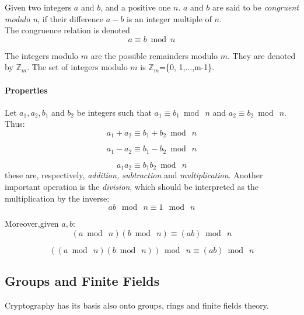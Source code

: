 \begin{teorema}
	Given two integers $a$ and $b$, and a positive one $n$. $a$ and $b$ are said to be \textit{congruent modulo n}, if their difference $a-b$ is an integer multiple of $n$.\\
	The congruence relation is denoted 
	\begin{equation}
	a \equiv b\bmod n
	\end{equation}
\end{teorema}
The integers modulo $m$ are the possible remainders modulo $m$. They are denoted by $\mathbb{Z}_{m}$. The set of integers modulo $m$ is $\mathbb{Z}_{m}$=\{0, 1,$\dots$,m-1\}.

\paragraph{Properties}
Let $a_{1}, a_{2}, b_{1}$ and $b_{2}$ be integers such that $a_{1}\equiv b_{1}\bmod\ n$ and $a_{2}\equiv b_{2}\bmod\ n$. Thus:
\begin{equation}
	a_{1}+a_{2}\equiv b_{1}+b_{2}\bmod\ n
\end{equation}

\begin{equation}
	a_{1}-a_{2}\equiv b_{1}-b_{2}\bmod\ n
\end{equation}

\begin{equation}
	a_{1}a_{2}\equiv b_{1}b_{2}\bmod\ n
\end{equation}
these are, respectively, \textit{addition, subtraction} and \textit{multiplication}.
Another important operation is the \textit{division}, which should be interpreted as the multiplication by the inverse:\\
\begin{equation}
ab\ \bmod\ n\equiv 1\ \bmod\ n
\end{equation}

Moreover,given $a,b$:
\begin{equation}
	(a\bmod\ n)(b\bmod\ n)\equiv (ab)\bmod\ n
\end{equation}

\begin{equation}
	((a\bmod\ n)(b\bmod\ n))\bmod\ n\equiv (ab)\bmod\ n
\end{equation}


\subsection{Groups and Finite Fields}
Cryptography has its basis also onto groups, rings and finite fields theory.

